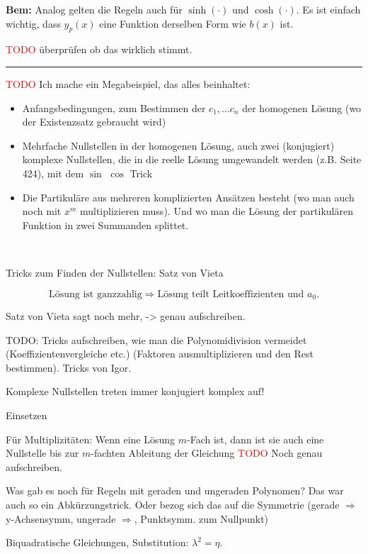 \documentclass[a4paper,landscape,8pt]{extarticle}
\newcommand{\todo}{\textcolor{red}{TODO }}
\newcommand{\sep}{\vspace{5pt}\noindent\hrule\vspace{5pt}}
\newcommand{\Bem}{\textbf{Bem: }}
\renewcommand*{\newpage}{ \ }
\begin{document}
\begin{multicols*}{4}
\Bem Analog gelten die Regeln auch für $\sinh(\cdot)$ und $\cosh(\cdot)$. Es ist
einfach wichtig, dass $y_p(x)$ eine Funktion derselben Form wie $b(x)$ ist.

\begin{warmup}
\todo überprüfen ob das wirklich stimmt.
\end{warmup}

\sep

\Bsp \todo Ich mache ein Megabeispiel, das alles beinhaltet:
\begin{itemize}
  \item Anfangsbedingungen, zum Bestimmen der $c_1, \ldots c_n$ der homogenen
  Lösung (wo der Existenzsatz gebraucht wird)
  \item Mehrfache Nullstellen in der homogenen Lösung, auch zwei (konjugiert)
  komplexe Nullstellen, die in die reelle Lösung umgewandelt werden (z.B. Seite
  424), mit dem $\sin$ $\cos$ Trick
  \item Die Partikuläre aus mehreren komplizierten Ansätzen
  besteht (wo man auch noch mit $x^m$ multiplizieren muss). Und wo man die
  Lösung der partikulären Funktion in zwei Summanden splittet.
\end{itemize}

\newpage

Tricks zum Finden der Nullstellen: Satz von Vieta

\[
\text{Lösung ist ganzzahlig} \Longrightarrow \text{Lösung teilt
Leitkoeffizienten und }a_0.
\]

Satz von Vieta sagt noch mehr, -> genau aufschreiben.

TODO: Tricks aufschreiben, wie man die Polynomidivision vermeidet
(Koeffizientenvergleiche etc.) (Faktoren ausmultiplizieren und den Rest
bestimmen). Tricks von Igor.

Komplexe Nullstellen treten immer konjugiert komplex auf!

Einsetzen

Für Multiplizitäten: Wenn eine Lösung $m$-Fach ist, dann ist sie auch eine
Nullstelle bis zur $m$-fachten Ableitung der Gleichung
\todo Noch genau aufschreiben.

Was gab es noch für Regeln mit geraden und ungeraden Polynomen? Das war auch so
ein Abkürzungstrick. Oder bezog sich das auf die Symmetrie (gerade
$\Longrightarrow$ y-Achsensymm, ungerade $\Longrightarrow$, Punktsymm. zum
Nullpunkt)

Biquadratische Gleichungen, Substitution: $\lambda^2 = \eta$.

\newpage


\end{multicols*}
\end{document}

